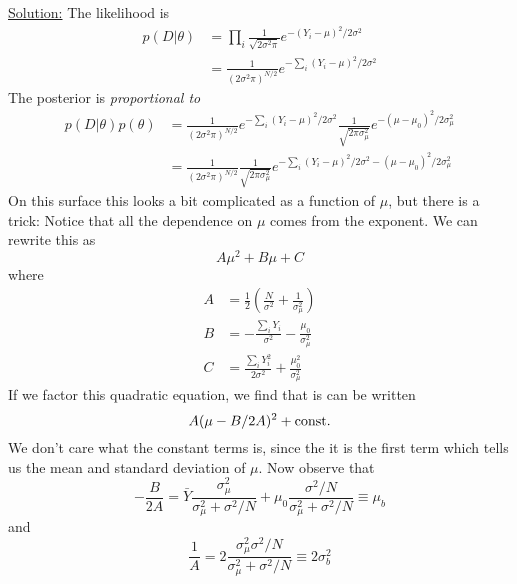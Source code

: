 \begin{itemize}
\begin{example}
\noindent
\underline{Solution:}   The likelihood is 
\begin{align*}
p(D|\theta) &= \prod_i \frac{1}{\sqrt{2 \sigma^2 \pi}}e^{-(Y_i - \mu)^2/2\sigma^2}\\
&=  \frac{1}{(2 \sigma^2 \pi)^{N/2}}e^{-\sum_i (Y_i - \mu)^2/2\sigma^2}
\end{align*}
The posterior is \emph{proportional to} 
\begin{align*}\label{eq:post_normal}
 p(D|\theta)p(\theta) &= \frac{1}{(2 \sigma^2 \pi)^{N/2}}e^{-\sum_i (Y_i - \mu)^2/2\sigma^2}\frac{1}{\sqrt{2\pi \sigma_{\mu}^2}}e^{-(\mu-\mu_0)^2/2\sigma_{\mu}^2}\\
&=  \frac{1}{(2 \sigma^2 \pi)^{N/2}}\frac{1}{\sqrt{2\pi \sigma_{\mu}^2}}e^{-\sum_i (Y_i - \mu)^2/2\sigma^2 - (\mu-\mu_0)^2/2\sigma_{\mu}^2}
\end{align*}
On this surface this looks a bit complicated as a function of $\mu$, but there is a trick: Notice that all the dependence on $\mu$ comes from the exponent. 
We can rewrite this as 
\begin{equation*}
A\mu^2 + B \mu  + C 
\end{equation*}
where
\begin{align*}
A &= \frac{1}{2}\left(\frac{N}{\sigma^2} + \frac{1}{\sigma_{\mu}^2}\right)\\
B &= -\frac{\sum_i Y_i}{\sigma^2} - \frac{\mu_0}{\sigma_{\mu}^2}\\
C &= \frac{\sum_i Y_i^2}{2\sigma^2} + \frac{\mu_0^2}{\sigma_{\mu}^2}
\end{align*}
If we factor this quadratic equation, we find that is can be written 
\begin{equation*}
A(\mu - B/2A)^2 + {\rm const.}
\end{equation*} 
We don't care what the constant terms is, since the it is the first term which tells us the mean and standard deviation of $\mu$. Now observe that 
\begin{equation*}
-\frac{B}{2A} = \bar{Y} \frac{\sigma_{\mu}^2}{\sigma_{\mu}^2 + \sigma^2/N} + \mu_0 \frac{\sigma^2/N}{\sigma_{\mu}^2 + \sigma^2/N}  \equiv \mu_b
\end{equation*}
and 
\begin{equation*}
\frac{1}{A} =2\frac{\sigma_{\mu}^2\sigma^2/N}{\sigma_{\mu}^2+\sigma^2/N} \equiv 2\sigma_b^2

\end{equation*}
\end{example}
\end{itemize}
